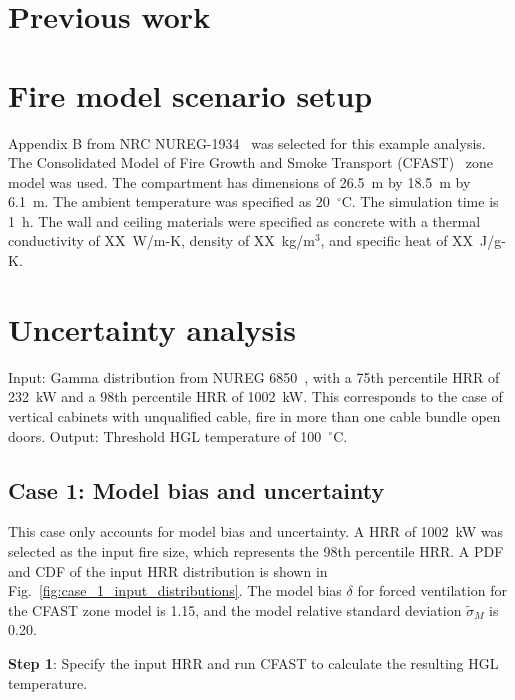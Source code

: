 \documentclass[12pt]{article}
\begin{document}
\section{Previous work}
\label{sec:previous_work}




\section{Fire model scenario setup}
\label{sec:fire_model_scenario_setup}

Appendix B from NRC NUREG-1934~\cite{NUREG_1934} was selected for this example analysis. The Consolidated Model of Fire Growth and Smoke Transport (CFAST)~\cite{CFAST_Users_Guide_6} zone model was used. The compartment has dimensions of 26.5~m by 18.5~m by 6.1~m. The ambient temperature was specified as 20~$^\circ$C. The simulation time is 1~h. The wall and ceiling materials were specified as concrete with a thermal conductivity of XX~W/m-K, density of XX~kg/m$^3$, and specific heat of XX~J/g-K.


\section{Uncertainty analysis}
\label{sec:uncertainty_analysis}

Input: Gamma distribution from NUREG 6850~\cite{NUREG_6850}, with a 75th percentile HRR of 232~kW and a 98th percentile HRR of 1002~kW. This corresponds to the case of vertical cabinets with unqualified cable, fire in more than one cable bundle open doors.
Output: Threshold HGL temperature of 100~$^\circ$C.


\clearpage


\subsection{Case 1: Model bias and uncertainty}

This case only accounts for model bias and uncertainty. A HRR of 1002~kW was selected as the input fire size, which represents the 98th percentile HRR. A PDF and CDF of the input HRR distribution is shown in Fig.~\ref{fig:case_1_input_distributions}. The model bias $\delta$ for forced ventilation for the CFAST zone model is 1.15, and the model relative standard deviation $\widetilde\sigma_M$ is 0.20.

\textbf{Step 1}: Specify the input HRR and run CFAST to calculate the resulting HGL temperature.
\end{document}
